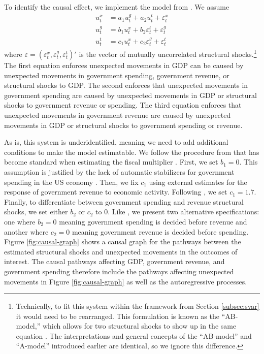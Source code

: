 To identify the causal effect, we implement the model from \textcite{blanchard2002empirical}. We assume
\begin{align*}
    u_t^x &= a_1 u_t^g + a_2 u_t^t + \varepsilon_t^x \\
    u_t^g &= b_1 u_t^x + b_2 \varepsilon_t^t + \varepsilon_t^g \\
    u_t^t &= c_1 u_t^x + c_2 \varepsilon_t^g + \varepsilon_t^t
\end{align*}
where $\varepsilon = (\varepsilon_t^x, \varepsilon_t^g, \varepsilon_t^t)'$ is the vector of mutually uncorrelated structural shocks.\footnote{Technically, to fit this system within the framework from Section \ref{subsec:svar} it would need to be rearranged. This formulation is known as the ``AB-model,'' which allows for two structural shocks to show up in the same equation \parencite{lutkepohl2005new}. The interpretations and general concepts of the ``AB-model'' and ``A-model'' introduced earlier are identical, so we ignore this difference.} The first equation enforces unexpected movements in GDP can be caused by unexpected movements in government spending, government revenue, or structural shocks to GDP. The second enforces that unexpected movements in government spending are caused by unexpected movements in GDP or structural shocks to government revenue or spending. The third equation enforces that unexpected movements in government revenue are caused by unexpected movements in GDP or structural shocks to government spending or revenue.

As is, this system is underidentified, meaning we need to add additional conditions to make the model estimatable. We follow the procedure from \textcite{blanchard2002empirical} that has become standard when estimating the fiscal multiplier \parencites{ramey2011can}{caldara2017analytics}{deleidi2021quantifying}. First, we set $b_1 = 0$. This assumption is justified by the lack of automatic stabilizers for government spending in the US economy \parencites{caldara2017analytics}. Then, we fix $c_1$ using external estimates for the response of government revenue to economic activity. Following \textcite{lutz2010fiscal}, we set $c_1 = 1.7$. Finally, to differentiate between government spending and revenue structural shocks, we set either $b_2$ or $c_2$ to 0. Like \textcite{blanchard2002empirical}, we present two alternative specifications: one where $b_2 = 0$ meaning government spending is decided before revenue and another where $c_2 = 0$ meaning government revenue is decided before spending. Figure \ref{fig:causal-graph} shows a causal graph for the pathways between the estimated structural shocks and unexpected movements in the outcomes of interest. The causal pathways affecting GDP, government revenue, and government spending therefore include the pathways affecting unexpected movements in Figure \ref{fig:causal-graph} as well as the autoregressive processes.

